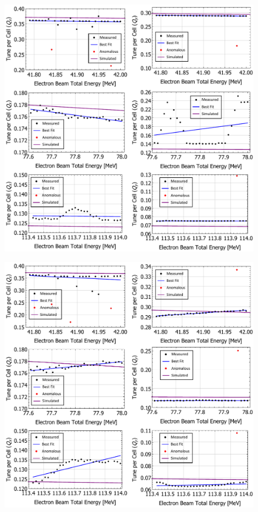 \documentclass[../main.tex]{subfiles}
\begin{document}
\begin{figure}[!h]
\centering
\includegraphics[width=\textwidth]{Figures/CBETA_Multi-Pass_Commissioning/FA_analysed_3turn_tunes.pdf}
\caption{}
\label{fig:FA_analysed_tunes}
\end{figure}

\begin{figure}[!h]
\centering
\includegraphics[width=\textwidth]{Figures/CBETA_Multi-Pass_Commissioning/FB_analysed_3turn_tunes.pdf}
\caption{}
\label{fig:FB_analysed_tunes}
\end{figure}
\end{document}
